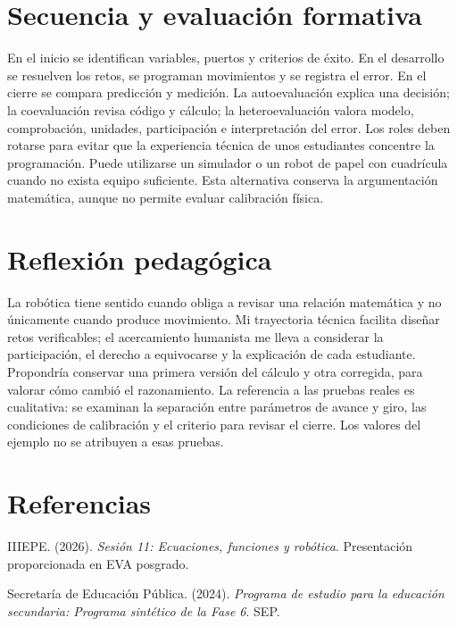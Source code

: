 \documentclass[spanish,letterpaper,oneside]{article}
\begin{document}
\section{Secuencia y evaluación formativa}
En el inicio se identifican variables, puertos y criterios de éxito. En el desarrollo se resuelven los retos, se programan movimientos y se registra el error. En el cierre se compara predicción y medición. La autoevaluación explica una decisión; la coevaluación revisa código y cálculo; la heteroevaluación valora modelo, comprobación, unidades, participación e interpretación del error.
Los roles deben rotarse para evitar que la experiencia técnica de unos estudiantes concentre la programación. Puede utilizarse un simulador o un robot de papel con cuadrícula cuando no exista equipo suficiente. Esta alternativa conserva la argumentación matemática, aunque no permite evaluar calibración física.
\section{Reflexión pedagógica}
La robótica tiene sentido cuando obliga a revisar una relación matemática y no únicamente cuando produce movimiento. Mi trayectoria técnica facilita diseñar retos verificables; el acercamiento humanista me lleva a considerar la participación, el derecho a equivocarse y la explicación de cada estudiante. Propondría conservar una primera versión del cálculo y otra corregida, para valorar cómo cambió el razonamiento. La referencia a las pruebas reales es cualitativa: se examinan la separación entre parámetros de avance y giro, las condiciones de calibración y el criterio para revisar el cierre. Los valores del ejemplo no se atribuyen a esas pruebas.

\section*{Referencias}
{\setlength{\parskip}{6pt}
\par\hangindent=1.27cm  IIIEPE. (2026). \textit{Sesión 11: Ecuaciones, funciones y robótica}. Presentación proporcionada en EVA posgrado.
\par\hangindent=1.27cm  Secretaría de Educación Pública. (2024). \textit{Programa de estudio para la educación secundaria: Programa sintético de la Fase 6}. SEP.
}
\end{document}
